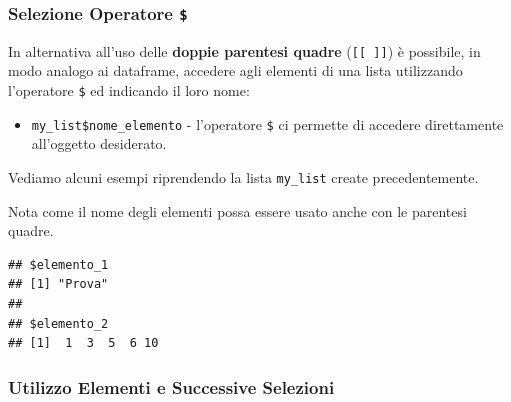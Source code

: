 \documentclass[
]{book}
\newenvironment{Shaded}{\begin{snugshade}}{\end{snugshade}}
\newcommand{\CommentTok}[1]{\textcolor[rgb]{0.56,0.35,0.01}{\textit{#1}}}
\newcommand{\DecValTok}[1]{\textcolor[rgb]{0.00,0.00,0.81}{#1}}
\newcommand{\NormalTok}[1]{#1}
\newcommand{\OperatorTok}[1]{\textcolor[rgb]{0.81,0.36,0.00}{\textbf{#1}}}
\providecommand{\tightlist}{%
  \setlength{\itemsep}{0pt}\setlength{\parskip}{0pt}}
\begin{document}
\hypertarget{selezione-operatore}{%
\subsubsection*{\texorpdfstring{Selezione Operatore \texttt{\$}}{Selezione Operatore \$}}\label{selezione-operatore}}

In alternativa all'uso delle \textbf{doppie parentesi quadre} (\texttt{{[}{[}\ {]}{]}}) è possibile, in modo analogo ai dataframe, accedere agli elementi di una lista utilizzando l'operatore \texttt{\$} ed indicando il loro nome:

\begin{itemize}
\tightlist
\item
  \texttt{my\_list\$nome\_elemento} - l'operatore \texttt{\$} ci permette di accedere direttamente all'oggetto desiderato.
\end{itemize}

Vediamo alcuni esempi riprendendo la lista \texttt{my\_list} create precedentemente.

\begin{Shaded}
\end{Shaded}

Nota come il nome degli elementi possa essere usato anche con le parentesi quadre.

\begin{verbatim}
## $elemento_1
## [1] "Prova"
## 
## $elemento_2
## [1]  1  3  5  6 10
\end{verbatim}

\hypertarget{utilizzo-elementi-e-successive-selezioni}{%
\subsubsection*{Utilizzo Elementi e Successive Selezioni}\label{utilizzo-elementi-e-successive-selezioni}}
\end{document}
